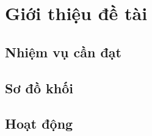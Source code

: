 \chapter{Giới thiệu đề tài}
\pagestyle{fancy}
    \section{Nhiệm vụ cần đạt}

    \section{Sơ đồ khối}

    \section{Hoạt động}